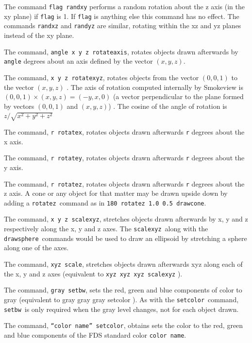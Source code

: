 \documentclass[11pt,twoside]{book}
\newcommand{\hitem}[1]{\item[{\bf #1} \hfill]}
\begin{document}
\hitem{randxy, randxz, randyz} The command {\tt flag randxy} performs a
random rotation about the z axis (in the xy plane) if
{\tt flag} is 1. If {\tt flag} is anything else this command has no effect.
The commands {\tt randxz} and {\tt randyz} are similar,
rotating within the xz and yz planes instead of the xy plane.

\hitem{rotateaxis} The command, {\tt angle x y z rotateaxis}, rotates objects
drawn afterwards by {\tt angle} degrees about an
axis defined by the vector $(x,y,z)$.

\hitem{rotatexyz} The command, {\tt x y z rotatexyz}, rotates objects from the
vector $(0,0,1)$ to the vector $(x,y,z)$ .  The
axis of rotation computed internally by Smokeview is $(0,0,1)\times
(x,y,z)=(-y,x,0)$ (a vector perpendicular to the plane formed by vectors
$(0,0,1)$ and $(x,y,z)$) . The cosine of the angle of rotation is $z/\sqrt{x^2+y^2+z^2}$

\hitem{rotatex} The command, {\tt r rotatex}, rotates objects drawn afterwards
{\tt r} degrees about the x axis.

\hitem{rotatey} The command, {\tt r rotatey}, rotates objects drawn afterwards
{\tt r} degrees about the y axis.

\hitem{rotatez} The command, {\tt r rotatez}, rotates objects drawn afterwards
{\tt r} degrees about the z axis.  A cone or any
object for that matter may be drawn upside down by adding a {\tt rotatez}\
command as in {\tt 180 rotatez 1.0 0.5 drawcone}.

\hitem{scalexyz} The command, {\tt x y z scalexyz}, stretches objects drawn
afterwards by x, y and z respectively along the x, y
and z axes. The {\tt scalexyz}\ along with the {\tt drawsphere}\ commands
would be used to draw an ellipsoid by stretching a sphere
along one of the axes.

\hitem{scale} The command, {\tt xyz scale}, stretches objects drawn afterwards
xyz along each of the x, y and z axes (equivalent
to {\tt xyz xyz xyz scalexyz} ).

\hitem{setbw} The command, {\tt gray setbw}, sets the red, green and blue components
of color to gray (equivalent to gray gray gray
setcolor ).  As with the {\tt setcolor}\ command, {\tt setbw}\ is only required when
the gray level changes, not for each object drawn.

\hitem{setcolor} The command, {\tt ``color name'' setcolor}, obtains sets the color
to the red, green and blue components of
the FDS standard color {\tt color~name}.
\end{document}
